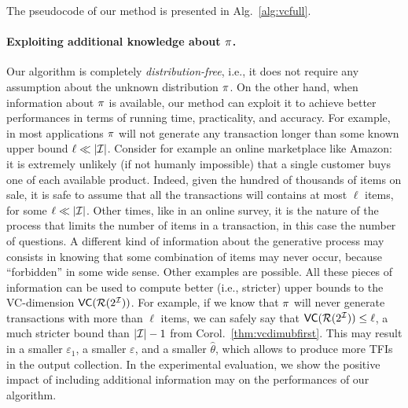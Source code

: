 The pseudocode of our method is presented in Alg.~\ref{alg:vcfull}.


\paragraph{Exploiting additional knowledge about $\pi$.} 
Our algorithm is completely \emph{distribution-free}, i.e., it does not require
any assumption about the unknown distribution $\pi$. On the other hand, when
information about $\pi$ is available, our method can exploit it to achieve
better performances in terms of running time, practicality, and accuracy. 
For example, in most applications $\pi$ will not generate any transaction
longer than some known upper bound $\ell\ll|{\cal I}|$. Consider for example an
online marketplace like Amazon: it is extremely unlikely (if not humanly
impossible) that a single customer buys one of each available product. Indeed,
given the hundred of thousands of items on sale, it is safe to assume that all
the transactions will contains at most $\ell$ items, for some $\ell\ll|{\cal I}|$. Other
times, like in an online survey, it is the nature of the process that limits the
number of items in a transaction, in this case the number of questions. A
different kind of information about the generative process may consists in
knowing that some combination of items may never occur, because ``forbidden'' in
some wide sense. Other examples are possible. All these pieces of information
can be used to compute better (i.e., stricter) upper bounds to the VC-dimension
$\mathsf{VC}(\mathcal{R}(2^{\cal I}))$. For example, if we know that $\pi$ will never generate
transactions with more than $\ell$ items, we can safely say that
$\mathsf{VC}(\mathcal{R}(2^{\cal I}))\le \ell$, a much stricter bound than $|{\cal I}|-1$ from
Corol.~\ref{thm:vcdimubfirst}. This may result in a smaller $\varepsilon_1$, a
smaller $\varepsilon$, and a smaller $\hat\theta$, which allows to produce more
TFIs in the output collection. In the experimental evaluation, we show the
positive impact of including additional information may on the performances of
our algorithm.

